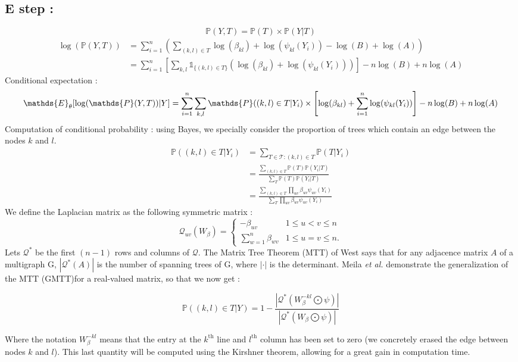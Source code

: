 \documentclass[a4paper,10pt]{article}
\begin{document}
\subsection{E step :}
\[ \mathds{P}(Y,T) = \mathds{P}(T)\times\mathds{P}(Y|T)\]
\begin{align*}
 \log(\mathds{P}(Y,T)) &=   \sum_{i=1}^n \left(\sum_{(k,l)\in T} \log(\beta_{kl})  +\log(\psi_{kl}(Y_i))- \log (B)+\log(A)\right)\\
 &=\sum_{i=1}^n \left[\sum_{k,l} \mathds{1}_{\{(k,l) \in T\}} \left(\log(\beta_{kl})  + \log(\psi_{kl}(Y_i))\right)\right]- n\log (B)+n\log(A)
\end{align*}
 Conditional expectation :
\[ \mathds{E}_\theta[\log(\mathds{P}(Y,T))|Y] \\
= \sum_{i=1}^n\sum_{k,l}  \mathds{P}((k,l)\in T | Y_i) \times \left[ \log(\beta_{kl}) + \sum_{i=1}^n\log(\psi_{kl}(Y_i)) \right]
 -n\log(B)+n\log(A)\]
 Computation of conditional probability : using Bayes, we specially consider the proportion of trees which contain an edge between the nodes $k$ and $l$.
 \begin{align*}
  \mathds{P}((k,l)\in T | Y_i)&=\sum_{T\in \mathcal{T} : (k,l)\in T}\mathds{P}( T | Y_i) \\
  &= \frac{\sum_{(k,l)\in T} \mathds{P}(T)\mathds{P}(Y_i|T)}{\sum_{T} \mathds{P}(T)\mathds{P}(Y_i|T)}\\
 &=\frac{\sum_{(k,l)\in T} \prod_{uv} \beta_{uv}  \psi_{uv}(Y_i)}{\sum_{T} \prod_{uv} \beta_{uv} \psi_{uv}(Y_i)}
 \end{align*}
 We define the Laplacian matrix as the following symmetric matrix :
 \[\mathcal{Q}_{uv}(W_\beta)=\begin{cases}
               -\beta_{uv} & 1\leq u<v \leq n\\
               \sum_{w=1}^n \beta_{wv} & 1\leq u=v \leq n.
            \end{cases}\]
 Lets $\mathcal{Q}^*$ be the first $(n-1)$ rows and columns of $\mathcal{Q}$. The  Matrix Tree Theorem (MTT) of West \cite{west} says that
 for any adjacence matrix $A$ of a multigraph G, $|\mathcal{Q}^*(A)|$ is the number of spanning trees of G, where $|\cdot|$ is the determinant.
 Meila \textit{et al.} \cite{meila} demonstrate the generalization of the MTT (GMTT)for a real-valued matrix, so that we now  get :

\[ \mathds{P}((k,l)\in T | Y) =1-\frac{|\mathcal{Q}^*(W_{\beta}^{-kl}\bigodot\psi)|}{|\mathcal{Q}^*(W_{\beta}\bigodot\psi)|}\]

Where the notation $W_{\beta}^{-kl}$ means that the entry at the $k^{\text{th}}$ line and $l^{\text{th}}$ column has been set to zero
(we concretely erased the edge between nodes $k$ and $l$). This last quantity will be computed using the Kirshner theorem, allowing for a great gain in computation time.
\end{document}
